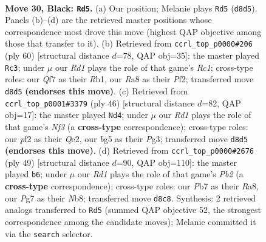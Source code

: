 \documentclass[11pt]{article}
\begin{document}
\clearpage

\begin{figure}[p]\centering
\begin{subfigure}{0.46\textwidth}\centering
\resizebox{\linewidth}{!}{%
\newchessgame
\chessboard[
  setfen={rn1r1k2/pp3qpQ/5P2/2P3B1/8/P5P1/BP3P2/2R1R1K1 b - - 0 30},
  showmover=false,
  pgfstyle=straightmove, color=movearrow, markmove={d8-d5}
]}
\caption{}
\end{subfigure}\hfill
\begin{subfigure}{0.46\textwidth}\centering
\resizebox{\linewidth}{!}{%
\newchessgame
\chessboard[
  setfen={r2r2k1/6p1/5p2/1qNbp2p/1P5P/6Q1/5PP1/1RR3K1 w - - 0 31},
  showmover=false,
  pgfstyle=straightmove, color=movearrow, markmove={c1-c3}
]}
\caption{}
\end{subfigure}
\\[4pt]
\begin{subfigure}{0.46\textwidth}\centering
\resizebox{\linewidth}{!}{%
\newchessgame
\chessboard[
  setfen={r3r1k1/4b1p1/1q2bp1p/3R3P/p1p5/5NP1/1P2QPB1/R5K1 w - - 1 24},
  showmover=false,
  pgfstyle=straightmove, color=movearrow, markmove={f3-d4}
]}
\caption{}
\end{subfigure}\hfill
\begin{subfigure}{0.46\textwidth}\centering
\resizebox{\linewidth}{!}{%
\newchessgame
\chessboard[
  setfen={rn2Q3/pp2p1k1/3p4/4r1Bp/4q2P/2P5/PP2p1P1/R3R1K1 b - - 2 25},
  showmover=false,
  pgfstyle=straightmove, color=movearrow, markmove={b7-b6}
]}
\caption{}
\end{subfigure}
\caption{\textbf{Move 30, Black: \texttt{Rd5}.} (a) Our position; Melanie plays \texttt{Rd5} (\texttt{d8d5}). Panels (b)--(d) are the retrieved master positions whose correspondence most drove this move (highest QAP objective among those that transfer to it). (b) Retrieved from \texttt{ccrl\_top\_p0000\#206} (ply 60) [structural distance $d$=78, QAP obj=35]: the master played \texttt{Rc3}; under $\mu$ our \emph{Rd1} plays the role of that game's \emph{Rc1}; cross-type roles: our \emph{Q}f7 as their \emph{R}b1, our \emph{R}a8 as their \emph{P}f2; transferred move \texttt{d8d5} \textbf{(endorses this move)}. (c) Retrieved from \texttt{ccrl\_top\_p0001\#3379} (ply 46) [structural distance $d$=82, QAP obj=17]: the master played \texttt{Nd4}; under $\mu$ our \emph{Rd1} plays the role of that game's \emph{Nf3} (a \textbf{cross-type} correspondence); cross-type roles: our \emph{p}f2 as their \emph{Q}e2, our \emph{b}g5 as their \emph{P}g3; transferred move \texttt{d8d5} \textbf{(endorses this move)}. (d) Retrieved from \texttt{ccrl\_top\_p0000\#2676} (ply 49) [structural distance $d$=90, QAP obj=110]: the master played \texttt{b6}; under $\mu$ our \emph{Rd1} plays the role of that game's \emph{Pb2} (a \textbf{cross-type} correspondence); cross-type roles: our \emph{P}b7 as their \emph{R}a8, our \emph{P}g7 as their \emph{N}b8; transferred move \texttt{d8c8}. Synthesis: 2 retrieved analogs transferred to \texttt{Rd5} (summed QAP objective 52, the strongest correspondence among the candidate moves); Melanie committed it via the \texttt{search} selector.}
\label{fig:thought-m59}
\end{figure}
\end{document}
